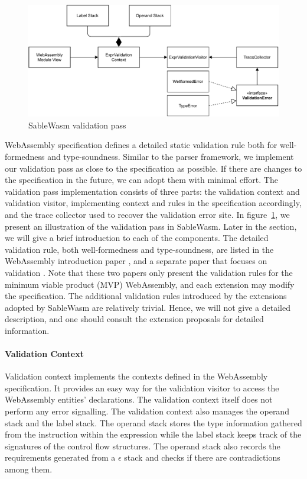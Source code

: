 \begin{figure}
  \centering
  \includegraphics[width=\textwidth]{Images/sablewasm-validation.pdf}
  \caption{SableWasm validation pass}
  \label{fig:sablewasm-validation}
\end{figure}

WebAssembly specification defines a  detailed static validation rule both for well-formedness and type-soundness. Similar to the parser framework, we implement our validation pass as close to the specification as possible. If there are changes to the specification in the future, we can adopt them with minimal effort. The validation pass implementation consists of three parts: the validation context and validation visitor, implementing context and rules in the specification accordingly, and the trace collector used to recover the validation error site.  In figure~\ref{fig:sablewasm-validation}, we present an illustration of the validation pass in SableWasm. Later in the section, we will give a brief introduction to each of the components. The detailed validation rule, both well-formedness and type-soundness, are listed in the WebAssembly introduction paper \cite{10.1145/3062341.3062363}, and a separate paper that focuses on validation \cite{10.1145/3167082}. Note that these two papers only present the validation rules for the minimum viable product (MVP) WebAssembly, and each extension may modify the specification.  The additional validation rules introduced by the extensions adopted by SableWasm are relatively trivial. Hence, we will not give a detailed description, and one should consult the extension proposals for detailed information.

\paragraph{Validation Context}
Validation context implements the contexts defined in the WebAssembly specification. It provides an easy way for the validation visitor to access the WebAssembly entities' declarations. The validation context itself does not perform any error signalling. The validation context also manages the operand stack and the label stack. The operand stack stores the type information gathered from the instruction within the expression while the label stack keeps track of the signatures of the control flow structures. The operand stack also records the requirements generated from a $\epsilon$ stack and checks if there are contradictions among them.

